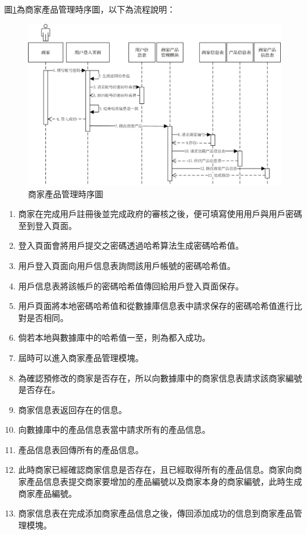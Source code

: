 	圖\ref{time3}為商家產品管理時序圖，以下為流程說明：

	\begin{figure}[htbp]
		\centering
		\includegraphics[width = 1\textwidth]{time3.jpg}
		\caption{商家產品管理時序圖}\label{time3}
	\end{figure}

	\begin{enumerate}
	\item 商家在完成用戶註冊後並完成政府的審核之後，便可填寫使用用戶與用戶密碼至到登入頁面。
	\item 登入頁面會將用戶提交之密碼透過哈希算法生成密碼哈希值。
	\item 用戶登入頁面向用戶信息表詢問該用戶帳號的密碼哈希值。
	\item 用戶信息表將該帳戶的密碼哈希值傳回給用戶登入頁面保存。
	\item 用戶頁面將本地密碼哈希值和從數據庫信息表中請求保存的密碼哈希值進行比對是否相同。
	\item 倘若本地與數據庫中的哈希值一至，則為都入成功。
	\item 屆時可以進入商家產品管理模塊。
	\item 為確認預修改的商家是否存在，所以向數據庫中的商家信息表請求該商家編號是否存在。
	\item 商家信息表返回存在的信息。
	\item 向數據庫中的產品信息表當中請求所有的產品信息。
	\item 產品信息表回傳所有的產品信息。
	\item 此時商家已經確認商家信息是否存在，且已經取得所有的產品信息。商家向商家產品信息表提交商家要增加的產品編號以及商家本身的商家編號，此時生成商家產品編號。
	\item 商家信息表在完成添加商家產品信息之後，傳回添加成功的信息到商家產品管理模塊。
	\end{enumerate}


